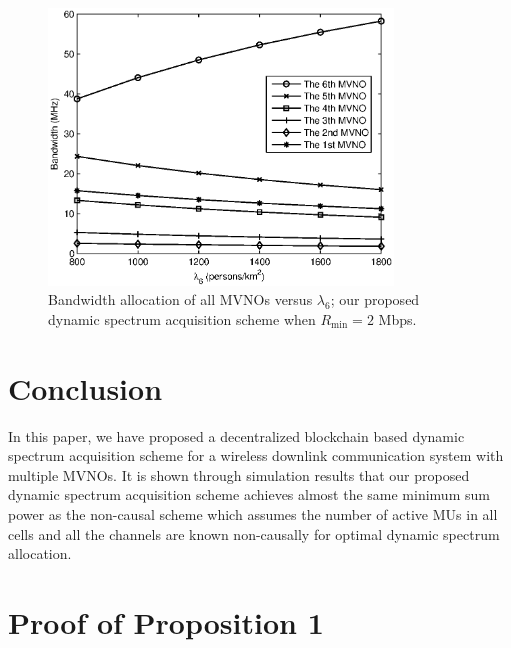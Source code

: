 \documentclass[journal]{IEEEtran}
\begin{document}
\begin{figure}
\centering
\includegraphics[width=3.6in]{fig5.eps}
\caption{Bandwidth allocation of all MVNOs versus $\lambda_6$; our proposed dynamic spectrum acquisition scheme when $R_{\min}=2$ Mbps.}
\end{figure}

\section{Conclusion}
In this paper, we have proposed a decentralized blockchain based dynamic spectrum acquisition scheme for a wireless downlink communication system with multiple MVNOs. It is shown through simulation results that our proposed dynamic spectrum acquisition scheme achieves almost the same minimum sum power as the non-causal scheme which assumes the number of active MUs in all cells and all the channels are known non-causally for optimal dynamic spectrum allocation.

\appendices
\section{Proof of Proposition 1}
\end{document}
